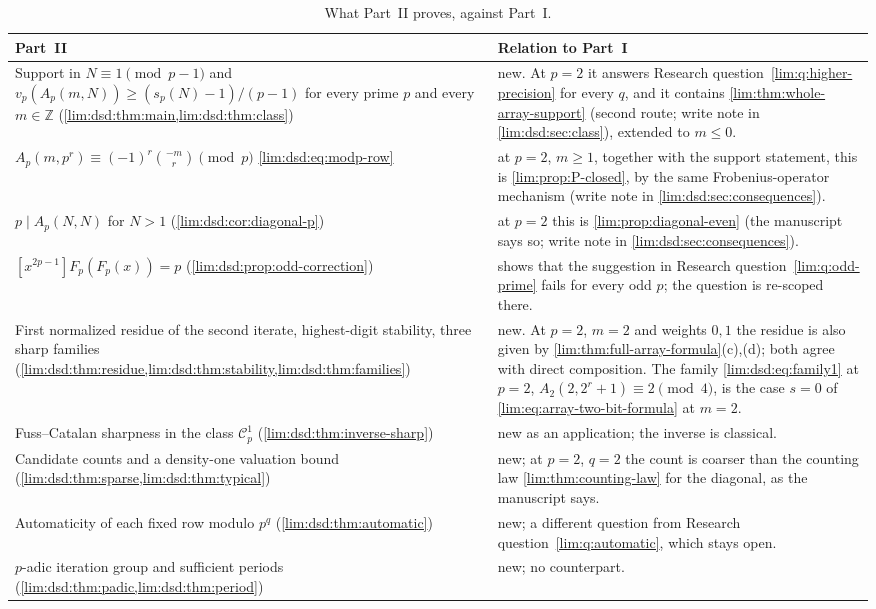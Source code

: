 \documentclass[11pt]{article}
\theoremstyle{definition}
\theoremstyle{remark}
\begin{document}
\begin{table}[htbp]
\centering\small
\renewcommand{\arraystretch}{1.15}
\begin{tabular}{@{}>{\raggedright\arraybackslash}p{}>{\raggedright\arraybackslash}p{}@{}}
\toprule
Part~II & Relation to Part~I\\
\midrule
Support in $N\equiv1\pmod{p-1}$ and
$v_p(A_p(m,N))\ge(s_p(N)-1)/(p-1)$ for every prime $p$ and every
$m\in\mathbb Z$ (\cref{lim:dsd:thm:main,lim:dsd:thm:class}) &
new. At $p=2$ it answers Research question~\ref{lim:q:higher-precision}
for every $q$, and it contains \cref{lim:thm:whole-array-support} (second
route; write note in \cref{lim:dsd:sec:class}), extended to $m\le0$.\\
$A_p(m,p^r)\equiv(-1)^r\binom{-m}{r}\pmod p$ \eqref{lim:dsd:eq:modp-row} &
at $p=2$, $m\ge1$, together with the support statement, this is
\cref{lim:prop:P-closed}, by the same Frobenius-operator mechanism (write
note in \cref{lim:dsd:sec:consequences}).\\
$p\mid A_p(N,N)$ for $N>1$ (\cref{lim:dsd:cor:diagonal-p}) &
at $p=2$ this is \cref{lim:prop:diagonal-even} (the manuscript says so;
write note in \cref{lim:dsd:sec:consequences}).\\
$[x^{2p-1}]F_p(F_p(x))=p$ (\cref{lim:dsd:prop:odd-correction}) &
shows that the suggestion in Research question~\ref{lim:q:odd-prime} fails
for every odd $p$; the question is re-scoped there.\\
First normalized residue of the second iterate, highest-digit stability,
three sharp families (\cref{lim:dsd:thm:residue,lim:dsd:thm:stability,lim:dsd:thm:families}) &
new. At $p=2$, $m=2$ and weights $0,1$ the residue is also given by
\cref{lim:thm:full-array-formula}(c),(d); both agree with direct
composition. The family \eqref{lim:dsd:eq:family1} at $p=2$,
$A_2(2,2^r+1)\equiv2\pmod4$, is the case $s=0$ of
\eqref{lim:eq:array-two-bit-formula} at $m=2$.\\
Fuss--Catalan sharpness in the class $\mathcal C_p^1$
(\cref{lim:dsd:thm:inverse-sharp}) & new as an application; the inverse is
classical.\\
Candidate counts and a density-one valuation bound
(\cref{lim:dsd:thm:sparse,lim:dsd:thm:typical}) &
new; at $p=2$, $q=2$ the count is coarser than the counting law
\cref{lim:thm:counting-law} for the diagonal, as the manuscript says.\\
Automaticity of each fixed row modulo $p^q$ (\cref{lim:dsd:thm:automatic}) &
new; a different question from Research question~\ref{lim:q:automatic},
which stays open.\\
$p$-adic iteration group and sufficient periods
(\cref{lim:dsd:thm:padic,lim:dsd:thm:period}) & new; no counterpart.\\
\bottomrule
\end{tabular}
\caption{What Part~II proves, against Part~I.}
\label{lim:dsd:tab:claims}
\end{table}
\end{document}
